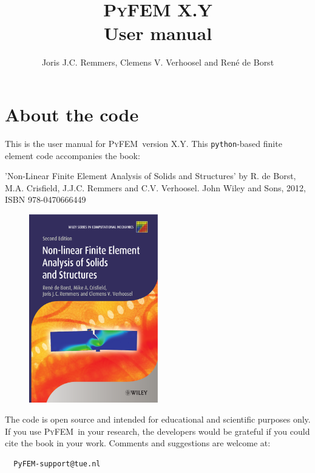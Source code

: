 \documentclass{article}
\title{\textsc{PyFEM} X.Y\\
\vspace{1cm}
User manual}
\author{Joris J.C. Remmers, Clemens V. Verhoosel and Ren\'e de Borst}
\newcommand{\progname}{\textsc{PyFEM}}
\begin{document}
\maketitle

\tableofcontents

\section{About the code}

This is the user manual for \progname~version X.Y. This \texttt{python}-based finite element code 
accompanies the book:                                              
          
\vspace{3mm}                                                       
\noindent         
'Non-Linear Finite Element Analysis of Solids and Structures' by      
 R. de Borst, M.A. Crisfield, J.J.C. Remmers and C.V. Verhoosel.        
 John Wiley and Sons, 2012, ISBN 978-0470666449                        

\begin{figure}[h]
\centering\includegraphics[width=0.5\textwidth]{img/cover.eps}
\end{figure}
                                                                          
\noindent
The code is open source and intended for educational and scientific     
purposes only. If you use \progname~in your research, the developers would 
be grateful if you could cite the book in your work. Comments and suggestions
are welcome at:
\begin{verbatim}
  PyFEM-support@tue.nl                                                                                                
\end{verbatim}
                                                                          
\end{document}
